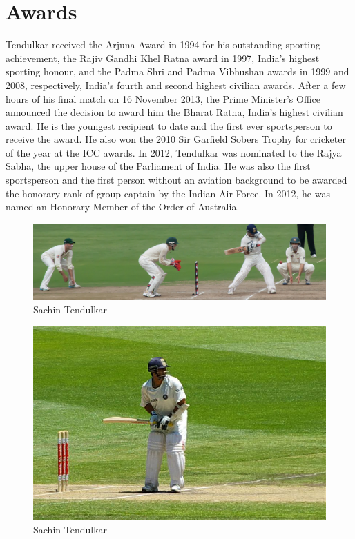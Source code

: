 \documentclass[a4paper,15pt]{report}
\begin{document}
\section{Awards}
Tendulkar received the Arjuna Award in 1994 for his outstanding sporting achievement, the Rajiv Gandhi Khel Ratna award in 1997, India's highest sporting honour, and the Padma Shri and Padma Vibhushan awards in 1999 and 2008, respectively, India's fourth and second highest civilian awards. After a few hours of his final match on 16 November 2013, the Prime Minister's Office announced the decision to award him the Bharat Ratna, India's highest civilian award. He is the youngest recipient to date and the first ever sportsperson to receive the award. He also won the 2010 Sir Garfield Sobers Trophy for cricketer of the year at the ICC awards. In 2012, Tendulkar was nominated to the Rajya Sabha, the upper house of the Parliament of India. He was also the first sportsperson and the first person without an aviation background to be awarded the honorary rank of group captain by the Indian Air Force. In 2012, he was named an Honorary Member of the Order of Australia.
\begin{figure}
	\centering
	\caption{Sachin Tendulkar}
\includegraphics[scale=0.15]{sachin-02.jpg}
\end{figure}

\begin{figure}
	\centering
	\caption{Sachin Tendulkar}
\includegraphics[scale=0.15]{sachin-03.jpg}
\end{figure}
\end{document}
